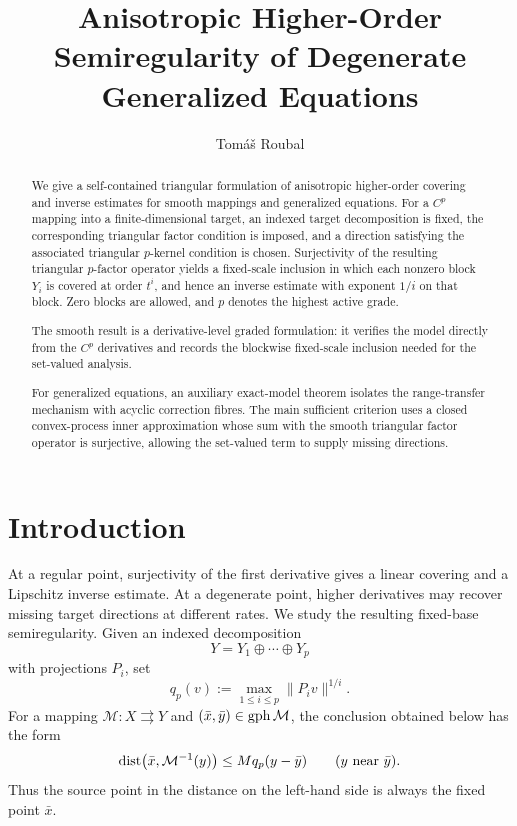\documentclass[11pt]{amsart}
\title[Higher-order semiregularity via acyclic ranges]%
{Anisotropic Higher-Order Semiregularity of Degenerate Generalized Equations}
\author{Tom\'a\v{s} Roubal}
\date{}
\theoremstyle{definition}
\theoremstyle{remark}
\newcommand{\tto}{\rightrightarrows}
\newcommand{\bx}{\bar x}
\newcommand{\by}{\bar y}
\newcommand{\gph}{\mathop{\rm gph}\nolimits}
\newcommand{\dist}{\mathop{\rm dist}\nolimits}
\begin{document}
	
	\begin{abstract}
		
		We give a self-contained triangular formulation of anisotropic higher-order
		covering and inverse estimates for smooth mappings and generalized equations.
		For a $C^p$ mapping into a finite-dimensional target, an indexed target
		decomposition is fixed, the corresponding triangular factor condition is
		imposed, and a direction satisfying the associated triangular $p$-kernel
		condition is chosen. Surjectivity of the resulting triangular $p$-factor
		operator yields a fixed-scale inclusion in which each nonzero block $Y_i$ is
		covered at order $t^i$, and hence an inverse estimate with exponent $1/i$ on
		that block. Zero blocks are allowed, and $p$ denotes the highest active grade.
		
		The smooth result is a derivative-level graded formulation: it verifies the
		model directly from the $C^p$ derivatives and records the blockwise
		fixed-scale inclusion needed for the set-valued analysis.
		
		For generalized equations, an auxiliary exact-model theorem isolates the
		range-transfer mechanism with acyclic correction fibres. The main sufficient
		criterion uses a closed convex-process inner approximation whose sum with
		the smooth triangular factor operator is surjective, allowing the set-valued
		term to supply missing directions.
		
	\end{abstract}
	
	\maketitle
	
	\section{Introduction}
	
	At a regular point, surjectivity of the first derivative gives a linear
	covering and a Lipschitz inverse estimate. At a degenerate point, higher
	derivatives may recover missing target directions at different rates. We
	study the resulting fixed-base semiregularity. Given an indexed
	decomposition
	$$
	Y=Y_1\oplus\cdots\oplus Y_p
	$$
	with projections $P_i$, set
	$$
	q_p(v):=\max_{1\le i\le p}\|P_i v\|^{1/i}.
	$$
	For a mapping $\mathcal M:X\tto Y$ and
	$(\bx,\by)\in\gph\mathcal M$, the conclusion obtained below has the form
	\begin{equation}
		\dist\bigl(\bx,\mathcal M^{-1}(y)\bigr)
		\le Mq_p(y-\by)
		\qquad (y\ \hbox{near }\by).
		\label{eq:intro-fixed-base-semiregularity}
	\end{equation}
	Thus the source point in the distance on the left-hand side is always the
	fixed point $\bx$.
	
\end{document}
